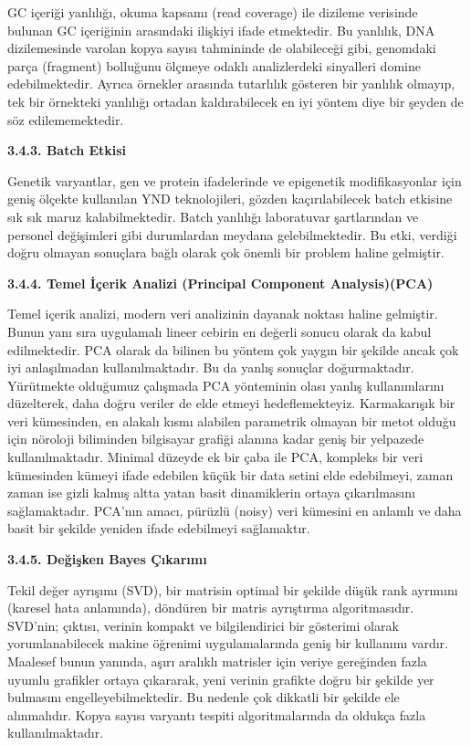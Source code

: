 \documentclass[11pt]{article}
\begin{document}
GC içeriği yanlılığı, okuma kapsamı (read coverage) ile dizileme verisinde bulunan GC içeriğinin arasındaki ilişkiyi ifade etmektedir. Bu yanlılık, DNA dizilemesinde varolan kopya sayısı tahmininde de olabileceği gibi, genomdaki parça (fragment) bolluğunu ölçmeye odaklı analizlerdeki sinyalleri domine edebilmektedir. Ayrıca örnekler arasında tutarlılık gösteren bir yanlılık olmayıp, tek bir örnekteki yanlılığı ortadan kaldırabilecek en iyi yöntem diye bir şeyden de söz edilememektedir.

{\bf 3.4.3. Batch Etkisi}

Genetik varyantlar, gen ve protein ifadelerinde ve epigenetik modifikasyonlar için geniş ölçekte kullanılan  YND teknolojileri, gözden kaçırılabilecek batch etkisine sık sık maruz kalabilmektedir. Batch yanlılığı laboratuvar şartlarından ve personel değişimleri gibi durumlardan meydana gelebilmektedir. Bu etki,  verdiği doğru olmayan sonuçlara bağlı olarak çok önemli bir problem haline gelmiştir.


{\bf 3.4.4. Temel İçerik Analizi (Principal Component Analysis)(PCA)}

Temel içerik analizi, modern veri analizinin dayanak  noktası haline gelmiştir. Bunun yanı sıra uygulamalı lineer cebirin en değerli sonucu olarak da kabul edilmektedir. PCA olarak da bilinen bu yöntem çok yaygın bir şekilde ancak çok iyi anlaşılmadan kullanılmaktadır. Bu da yanlış sonuçlar doğurmaktadır. Yürütmekte olduğumuz çalışmada PCA yönteminin olası yanlış kullanımlarını düzelterek, daha doğru veriler de elde etmeyi hedeflemekteyiz. Karmakarışık bir veri kümesinden, en alakalı kısmı alabilen parametrik olmayan bir metot olduğu için nöroloji biliminden bilgisayar grafiği alanına kadar geniş bir yelpazede kullanılmaktadır. Minimal düzeyde ek bir çaba ile PCA, kompleks bir veri kümesinden kümeyi ifade edebilen küçük bir data setini elde edebilmeyi, zaman zaman ise gizli kalmış altta yatan basit dinamiklerin ortaya çıkarılmasını sağlamaktadır. PCA'nın amacı,  pürüzlü (noisy) veri kümesini en anlamlı ve daha basit bir şekilde yeniden ifade edebilmeyi sağlamaktır.


{\bf 3.4.5. Değişken Bayes Çıkarımı}


Tekil değer ayrışımı (SVD), bir matrisin optimal bir şekilde düşük rank ayrımını (karesel hata anlamında), döndüren bir matris  ayrıştırma algoritmasıdır. SVD'nin; çıktısı, verinin kompakt ve bilgilendirici bir gösterimi olarak yorumlanabilecek makine öğrenimi uygulamalarında geniş bir kullanımı vardır. Maalesef bunun yanında, aşırı aralıklı matrisler için veriye gereğinden fazla uyumlu grafikler ortaya çıkararak, yeni verinin grafikte doğru bir şekilde yer bulmasını engelleyebilmektedir. Bu nedenle çok dikkatli bir şekilde ele alınmalıdır. Kopya sayısı varyantı tespiti algoritmalarında da  oldukça fazla kullanılmaktadır.
\end{document}
